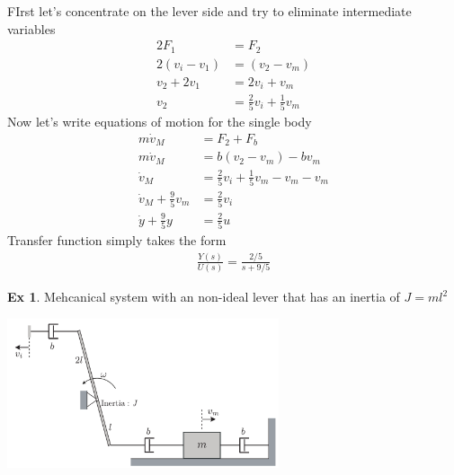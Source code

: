 \documentclass[twoside]{article}
\theoremstyle{definition}
\newtheorem{exmp}[theorem]{Ex}
\begin{document}
\vspace{12pt}

FIrst let's concentrate on the lever side and try to eliminate
intermediate variables
%
\begin{align*}
  2 F_1 &= F_2  \\
  2 (v_i - v_1)  &= (v_2 - v_m) \\
  v_2 + 2 v_1 &= 2 v_i + v_m  \\
  v_2 &= \frac{2}{5} v_i + \frac{1}{5} v_m            
\end{align*}
%
Now let's write equations of motion for the single body
%
\begin{align*}
  m \dot{v}_M &= F_2 + F_b \\
  m \dot{v}_M &= b ( v_2 - v_m ) - b v_m \\
  \dot{v}_M &=  \frac{2}{5} v_i + \frac{1}{5} v_m  - v_m - v_m \\
  \dot{v}_M + \frac{9}{5} v_m &=  \frac{2}{5} v_i \\
   \dot{y} + \frac{9}{5} y &=  \frac{2}{5} u
\end{align*}
%
Transfer function simply takes the form
%
\begin{align*}
  \frac{Y(s)}{U(s)} = \frac{2/5}{s + 9/5}
\end{align*}


\begin{exmp}
Mehcanical system with an non-ideal lever that has an inertia of $J = m l^2$
\end{exmp}

\vspace{12pt}
  
\begin{minipage}[h]{1\linewidth}
    \begin{center}
      \includegraphics[width=0.6\textwidth]{lever}
    \end{center}
\end{minipage}   

\vspace{12pt}
\end{document}
